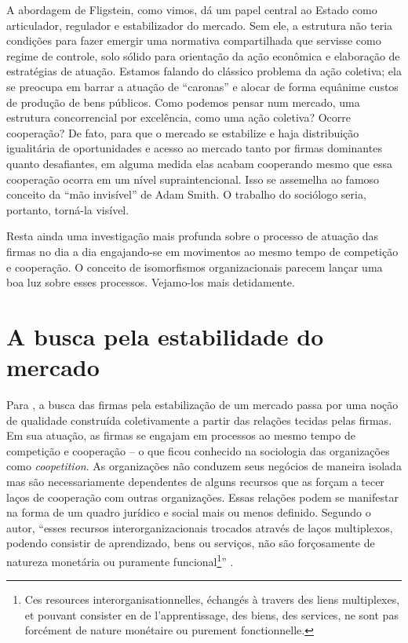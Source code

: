 \documentclass[a4paper, 12pt, openright, oneside, german, french, english, brazil]{abntex2}
\begin{document}
	A abordagem de Fligstein, como vimos, dá um papel central ao Estado como articulador, regulador e estabilizador do mercado. Sem ele, a estrutura não teria condições para fazer emergir uma normativa compartilhada que servisse como regime de controle, solo sólido para orientação da ação econômica e elaboração de estratégias de atuação. Estamos falando do clássico problema da ação coletiva; ela se preocupa em barrar a atuação de ``caronas'' e alocar de forma equânime custos de produção de bens públicos. Como podemos pensar num mercado, uma estrutura concorrencial por excelência, como uma ação coletiva? Ocorre cooperação? De fato, para que o mercado se estabilize e haja distribuição igualitária de oportunidades e acesso ao mercado tanto por firmas dominantes quanto desafiantes, em alguma medida  elas acabam cooperando mesmo que essa cooperação ocorra em um nível supraintencional. Isso se assemelha ao famoso conceito da ``mão invisível'' de Adam Smith. O trabalho do sociólogo seria, portanto, torná-la visível.

	Resta ainda uma investigação mais profunda sobre o processo de atuação das firmas no dia a dia engajando-se em movimentos ao mesmo tempo de competição e cooperação. O conceito de isomorfismos organizacionais parecem lançar uma boa luz sobre esses processos. Vejamo-los mais detidamente.



	\section{A busca pela estabilidade do mercado}

	Para , a busca das firmas pela estabilização de um mercado passa por uma noção de qualidade construída coletivamente a partir das relações tecidas pelas firmas. Em sua atuação, as firmas se engajam em processos ao mesmo tempo de competição e cooperação -- o que ficou conhecido na sociologia das organizações como \textit{coopetition}. As organizações não conduzem seus negócios de maneira isolada mas são necessariamente dependentes de alguns recursos que as forçam a tecer laços de cooperação com outras organizações. Essas relações podem se manifestar na forma de um quadro jurídico e social mais ou menos definido. Segundo o autor, ``esses recursos interorganizacionais trocados através de laços multiplexos, podendo consistir de aprendizado, bens ou serviços, não são forçosamente de natureza monetária ou puramente funcional\footnote{Ces resources interorganisationnelles, échangés à travers des liens multiplexes, et pouvant consister en de l'apprentissage, des biens, des services, ne sont pas forcément de nature monétaire ou purement fonctionnelle.}'' \cite[p. 568]{lazega2009theorie}.
\end{document}
